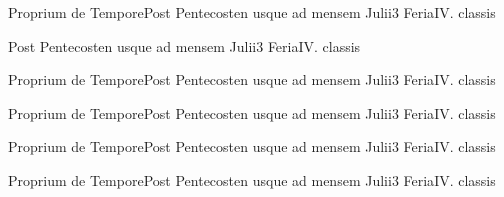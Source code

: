 \documentclass[nocturnale-romanum.tex]{subfiles}
\begin{document}
	{Proprium de Tempore}{Post Pentecosten usque ad mensem Julii}{3}{}
	{Feria}{IV. classis}{}
	{}
	{}

	{Post Pentecosten usque ad mensem Julii}{3}{}
	{Feria}{IV. classis}{}
	{}
	{}

	{Proprium de Tempore}{Post Pentecosten usque ad mensem Julii}{3}{}
	{Feria}{IV. classis}{}
	{}
	{}

	{Proprium de Tempore}{Post Pentecosten usque ad mensem Julii}{3}{}
	{Feria}{IV. classis}{}
	{}
	{}

	{Proprium de Tempore}{Post Pentecosten usque ad mensem Julii}{3}{}
	{Feria}{IV. classis}{}
	{}
	{}

	{Proprium de Tempore}{Post Pentecosten usque ad mensem Julii}{3}{}
	{Feria}{IV. classis}{}
	{}
	{}
\end{document}

